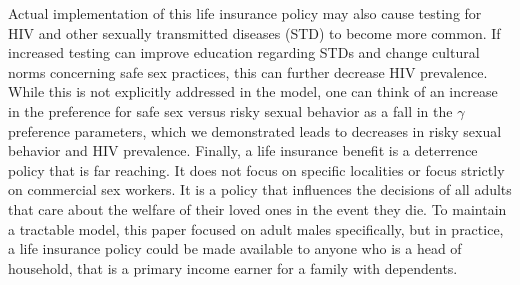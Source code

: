 \documentclass[12pt]{article}
\begin{document}
Actual implementation of this life insurance policy may also cause testing for HIV and other sexually transmitted diseases (STD) to become more common.  If increased testing can improve education regarding STDs and change cultural norms concerning safe sex practices, this can further decrease HIV prevalence.  While this is not explicitly addressed in the model, one can think of an increase in the preference for safe sex versus risky sexual behavior as a fall in the $\gamma$ preference parameters, which we demonstrated leads to decreases in risky sexual behavior and HIV prevalence.  Finally, a life insurance benefit is a deterrence policy that is far reaching.  It does not focus on specific localities or focus strictly on commercial sex workers.  It is a policy that influences the decisions of all adults that care about the welfare of their loved ones in the event they die.  To maintain a tractable model, this paper focused on adult males specifically, but in practice, a life insurance policy could be made available to anyone who is a head of household, that is a primary income earner for a family with dependents.

\newpage
\begin{singlespace}
\nocite{*}


\end{singlespace}

\newpage
\end{document}
